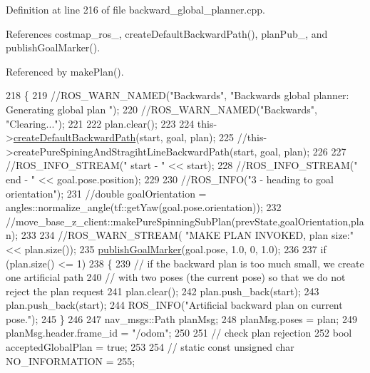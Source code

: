Definition at line 216 of file backward\+\_\+global\+\_\+planner.\+cpp.



References costmap\+\_\+ros\+\_\+, create\+Default\+Backward\+Path(), plan\+Pub\+\_\+, and publish\+Goal\+Marker().



Referenced by make\+Plan().


\begin{DoxyCode}
218 \{
219     \textcolor{comment}{//ROS\_WARN\_NAMED("Backwards", "Backwards global planner: Generating global plan ");}
220     \textcolor{comment}{//ROS\_WARN\_NAMED("Backwards", "Clearing...");}
221 
222     plan.clear();
223 
224     this->\hyperlink{classmove__base__z__client_1_1backward__global__planner_1_1BackwardGlobalPlanner_a395d7f10f5e8dfb26fe9809912f29795}{createDefaultBackwardPath}(start, goal, plan);
225     \textcolor{comment}{//this->createPureSpiningAndStragihtLineBackwardPath(start, goal, plan);}
226 
227     \textcolor{comment}{//ROS\_INFO\_STREAM(" start - " << start);}
228     \textcolor{comment}{//ROS\_INFO\_STREAM(" end - " << goal.pose.position);}
229 
230     \textcolor{comment}{//ROS\_INFO("3 - heading to goal orientation");}
231     \textcolor{comment}{//double goalOrientation = angles::normalize\_angle(tf::getYaw(goal.pose.orientation));}
232     \textcolor{comment}{//move\_base\_z\_client::makePureSpinningSubPlan(prevState,goalOrientation,plan);}
233 
234     \textcolor{comment}{//ROS\_WARN\_STREAM( "MAKE PLAN INVOKED, plan size:"<< plan.size());}
235     \hyperlink{classmove__base__z__client_1_1backward__global__planner_1_1BackwardGlobalPlanner_adefb1127aa2a4f9c487763aea3817864}{publishGoalMarker}(goal.pose, 1.0, 0, 1.0);
236 
237     \textcolor{keywordflow}{if} (plan.size() <= 1)
238     \{
239         \textcolor{comment}{// if the backward plan is too much small, we create one artificial path}
240         \textcolor{comment}{// with two poses (the current pose) so that we do not reject the plan request        }
241         plan.clear();
242         plan.push\_back(start);
243         plan.push\_back(start);
244         ROS\_INFO(\textcolor{stringliteral}{"Artificial backward plan on current pose."});
245     \}
246 
247     nav\_msgs::Path planMsg;
248     planMsg.poses = plan;
249     planMsg.header.frame\_id = \textcolor{stringliteral}{"/odom"};
250 
251         \textcolor{comment}{// check plan rejection}
252     \textcolor{keywordtype}{bool} acceptedGlobalPlan = \textcolor{keyword}{true};
253 
254     \textcolor{comment}{// static const unsigned char NO\_INFORMATION = 255;}

\end{DoxyCode}
